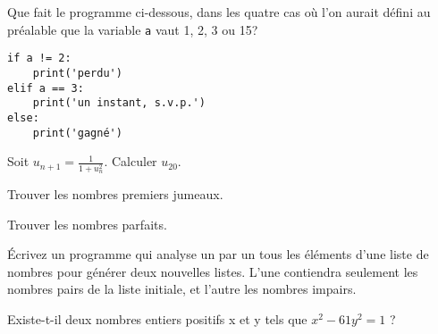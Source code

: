 \begin{question}
Que fait le programme ci-dessous, dans les quatre cas où l'on aurait défini au
préalable que la variable \texttt{a} vaut 1, 2, 3 ou 15?
\begin{verbatim}
if a != 2: 
    print('perdu')
elif a == 3:
    print('un instant, s.v.p.')
else: 
    print('gagné')
\end{verbatim}
\end{question}

\begin{question}
Soit $u_{n+1}= \frac{1}{1+u_n^2}$.
Calculer $u_20$.
\end{question}

\begin{question}
Trouver les nombres premiers jumeaux.
\end{question}

\begin{question}
Trouver les nombres parfaits.
\end{question}

\begin{question}
Écrivez un programme qui analyse un par un tous les éléments d'une liste de
nombres pour générer deux nouvelles listes. L'une contiendra seulement les
nombres pairs de la liste initiale, et l'autre les nombres impairs.
\end{question}

\begin{question}
Existe-t-il deux nombres entiers positifs x et y tels que $x^2 − 61y^2 = 1$ ?
\end{question}
